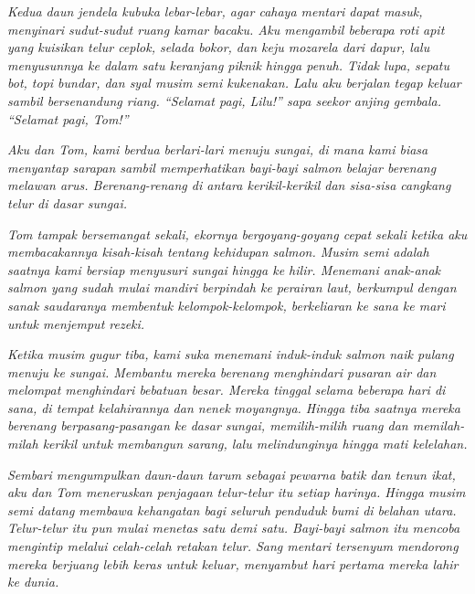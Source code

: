\documentclass[smalldemyvopaper,11pt,twoside,onecolumn,openright,extrafontsizes]{memoir}
\begin{document}
\textit{Kedua daun jendela kubuka lebar-lebar, agar cahaya mentari dapat masuk, menyinari sudut-sudut ruang kamar bacaku. Aku mengambil beberapa roti apit yang kuisikan telur ceplok, selada bokor, dan keju mozarela dari dapur, lalu menyusunnya ke dalam satu keranjang piknik hingga penuh. Tidak lupa, sepatu bot, topi bundar, dan syal musim semi kukenakan. Lalu aku berjalan tegap keluar sambil bersenandung riang. ``Selamat pagi, Lilu!'' sapa seekor anjing gembala. ``Selamat pagi, Tom!''}

\textit{Aku dan Tom, kami berdua berlari-lari menuju sungai, di mana kami biasa menyantap sarapan sambil memperhatikan bayi-bayi salmon belajar berenang melawan arus. Berenang-renang di antara kerikil-kerikil dan sisa-sisa cangkang telur di dasar sungai.}


\textit{Tom tampak bersemangat sekali, ekornya bergoyang-goyang cepat sekali ketika aku membacakannya kisah-kisah tentang kehidupan salmon. Musim semi adalah saatnya kami bersiap menyusuri sungai hingga ke hilir. Menemani anak-anak salmon yang sudah mulai mandiri berpindah ke perairan laut, berkumpul dengan sanak saudaranya membentuk kelompok-kelompok, berkeliaran ke sana ke mari untuk menjemput rezeki.}


\textit{Ketika musim gugur tiba, kami suka menemani induk-induk salmon naik pulang menuju ke sungai. Membantu mereka berenang menghindari pusaran air dan melompat menghindari bebatuan besar. Mereka tinggal selama beberapa hari di sana, di tempat kelahirannya dan nenek moyangnya. Hingga tiba saatnya mereka berenang berpasang-pasangan ke dasar sungai, memilih-milih ruang dan memilah-milah kerikil untuk membangun sarang, lalu melindunginya hingga mati kelelahan.}


\textit{Sembari mengumpulkan daun-daun tarum sebagai pewarna batik dan tenun ikat, aku dan Tom meneruskan penjagaan telur-telur itu setiap harinya. Hingga musim semi datang membawa kehangatan bagi seluruh penduduk bumi di belahan utara. Telur-telur itu pun mulai menetas satu demi satu. Bayi-bayi salmon itu mencoba mengintip melalui celah-celah retakan telur. Sang mentari tersenyum mendorong mereka berjuang lebih keras untuk keluar, menyambut hari pertama mereka lahir ke dunia.}

\end{document}
